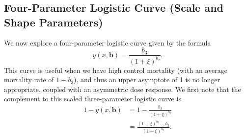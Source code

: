 \documentclass[11pt, letterpaper]{article}
\numberwithin{equation}{section}
\begin{document}
\subsection{Four-Parameter Logistic Curve (Scale and Shape Parameters)}
We now explore a four-parameter logistic curve given by the formula
$$ y(x, \bm b) = \frac{b_3}{(1+\xi)^{b_2}} .$$ 
This curve is useful when we have high control mortality (with an average mortality rate of $1-b_3$), and thus an upper asymptote of 1 is no longer appropriate, coupled with an asymmetric dose response. We first note that the complement to this scaled three-parameter logistic curve is 
\begin{align*}
1 - y(x, \bm b) & = 1- \frac{b_3}{(1+\xi)^{b_2}} \\
& = \frac{(1+\xi)^{b_2} - b_3}{(1+\xi)^{b_2}}.
\end{align*}
\end{document}

